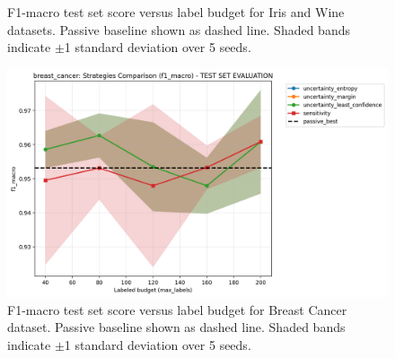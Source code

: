 \documentclass[conference]{IEEEtran}
\begin{document}
\begin{figure}[t]
\centering
{}
\hfill
{}
\caption{F1-macro test set score versus label budget for Iris and Wine datasets. Passive baseline shown as dashed line. Shaded bands indicate $\pm$1 standard deviation over 5 seeds.}
\label{fig:iris-f1-test-compare}
\end{figure}

\begin{figure}[t]
\centering
\includegraphics[width=0.95\columnwidth]{figures/cls_breast_cancer_comparison_f1_macro_test.png}
\caption{F1-macro test set score versus label budget for Breast Cancer dataset. Passive baseline shown as dashed line. Shaded bands indicate $\pm$1 standard deviation over 5 seeds.}
\label{fig:breast-f1-test-compare}
\end{figure}
\end{document}
